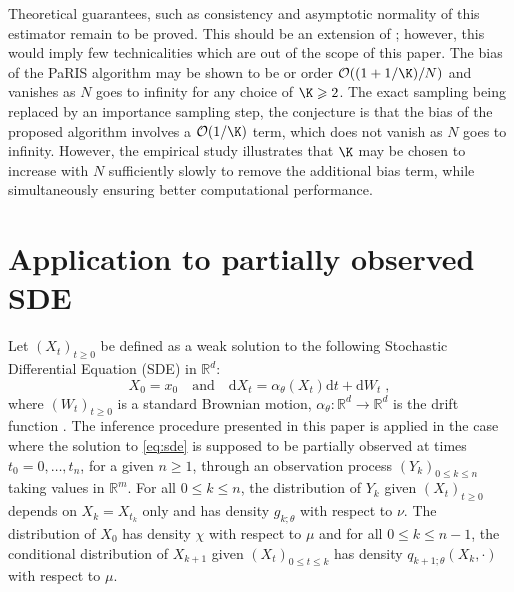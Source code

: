 \documentclass{article}
\def\dimX{d}
\def\Xset{\mathbb{R}^d}
\newcommand{\md}[1]{g_{#1}}
\newcommand{\parvec}{\theta}
\newcommand{\hd}[1]{q_{#1}}
\newcommand{\N}{N}
\newcommand{\rmd}{\ensuremath{\mathrm{d}}}
\newcommand{\eqsp}{\;}
\begin{document}
Theoretical guarantees, such as consistency and asymptotic normality of this estimator remain to be proved. 
This should be an extension of \cite{gloaguen2021pseudo}; however, this would imply few technicalities which are out of the scope of this paper. The bias of the PaRIS algorithm may be shown to be or order $\mathcal{O}((1 + 1/\K)/\N)$ and vanishes as $\N$ goes to infinity for any choice of $\K\geqslant 2$. 
The exact sampling being replaced by an importance sampling step, the conjecture is that  the bias of the proposed algorithm involves a $\mathcal{O}(1/\K)$ term, which does not vanish as $\N$ goes to infinity. 
However, the empirical study illustrates that $\K$ may be chosen to increase with $\N$ sufficiently slowly to remove the additional bias term, while simultaneously ensuring better computational performance. %




\appendix 

\section{Application to partially observed SDE}
\label{sec:filter:SDE}
Let $(X_t)_{t\ge 0}$ be defined as a weak solution to the following Stochastic Differential Equation (SDE) in $\mathbb{R}^d$:
\begin{equation}
\label{eq:sde}
X_0 = x_0 \quad\mbox{and}\quad \rmd X_t = \alpha_{\parvec}(X_t)\rmd t + \rmd W_t\eqsp,
\end{equation}
where $(W_t)_{t\geqslant 0}$ is a standard Brownian motion, $\alpha_{\parvec}: \Xset\to\Xset$ is the drift function
. The inference procedure presented in this paper is applied in the case where the solution to \eqref{eq:sde} is supposed to be partially observed at times $t_0 = 0,\ldots,t_n$, for a given $n\geqslant 1$, through an observation process $(Y_k)_{0\leqslant k \leqslant n}$ taking values in $\mathbb{R}^m$. For all $0\leqslant k \leqslant n$, the distribution of $Y_k$ given $(X_t)_{t\geqslant 0}$ depends on $X_k = X_{t_k}$ only and has density $\md{k;\parvec}$ with respect to $\nu$. The distribution of $X_0$ has density $\chi$ with respect to $\mu$ and for all $0\leqslant k \leqslant n-1$, the conditional distribution of $X_{k+1} $ given $(X_{t})_{0\leqslant t\leqslant k}$ has density $\hd{k+1;\parvec}(X_{k},\cdot)$ with respect to $\mu$. 
\end{document}
